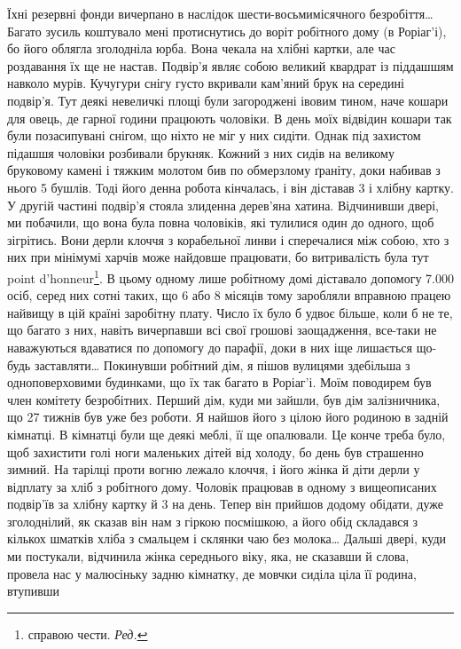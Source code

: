 Їхні резервні фонди вичерпано в наслідок шести-восьмимісячного
безробіття\dots{} Багато зусиль коштувало мені протиснутись
до воріт робітного дому (в Роріаг’і), бо його облягла зголодніла
юрба. Вона чекала на хлібні картки, але час роздавання
їх ще не настав. Подвір’я являє собою великий квардрат із
піддашшям навколо мурів. Кучугури снігу густо вкривали
кам’яний брук на середині подвір’я. Тут деякі невеличкі площі
були загороджені івовим тином, наче кошари для овець, де гарної
години працюють чоловіки. В день моїх відвідин кошари так
були позасипувані снігом, що ніхто не міг у них сидіти. Однак
під захистом підашшя чоловіки розбивали брукняк. Кожний з
них сидів на великому бруковому камені і тяжким молотом бив
по обмерзлому ґраніту, доки набивав з нього 5 бушлів. Тоді його
денна робота кінчалась, і він діставав 3 і хлібну картку.
У другій частині подвір’я стояла злиденна дерев’яна хатина.
Відчинивши двері, ми побачили, що вона була повна чоловіків,
які тулилися один до одного, щоб зігрітись. Вони дерли клоччя
з корабельної линви і сперечалися між собою, хто з них при мінімумі
харчів може найдовше працювати, бо витривалість була
тут point d’honneur\footnote*{
справою чести. \emph{Ред.}
}. В цьому одному лише робітному домі діставало
допомогу \num{7.000} осіб, серед них сотні таких, що 6 або 8 місяців
тому заробляли вправною працею найвищу в цій країні
заробітну плату. Число їх було б удвоє більше, коли б не те,
що багато з них, навіть вичерпавши всі свої грошові заощадження,
все-таки не наважуються вдаватися по допомогу до парафії,
доки в них іще лишається що-будь заставляти\dots{} Покинувши робітний
дім, я пішов вулицями здебільша з одноповерховими будинками,
що їх так багато в Роріаг’і. Моїм поводирем був член
комітету безробітних. Перший дім, куди ми зайшли, був дім
залізничника, що 27 тижнів був уже без роботи. Я найшов його
з цілою його родиною в задній кімнатці. В кімнатці були ще
деякі меблі, її ще опалювали. Це конче треба було, щоб захистити
голі ноги маленьких дітей від холоду, бо день був страшенно
зимний. На тарілці проти вогню лежало клоччя, і його жінка
й діти дерли у відплату за хліб з робітного дому. Чоловік працював
в одному з вищеописаних подвір’їв за хлібну картку й
3 на день. Тепер він прийшов додому обідати, дуже зголоднілий,
як сказав він нам з гіркою посмішкою, а його обід
складався з кількох шматків хліба з смальцем і склянки чаю
без молока\dots{} Дальші двері, куди ми постукали, відчинила жінка
середнього віку, яка, не сказавши й слова, провела нас у малюсіньку
задню кімнатку, де мовчки сиділа ціла її родина, втупивши
\parbreak{}  %
